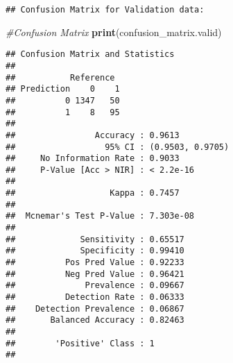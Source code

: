 \documentclass[
]{article}
\newenvironment{Shaded}{\begin{snugshade}}{\end{snugshade}}
\newcommand{\AttributeTok}[1]{\textcolor[rgb]{0.13,0.29,0.53}{#1}}
\newcommand{\CommentTok}[1]{\textcolor[rgb]{0.56,0.35,0.01}{\textit{#1}}}
\newcommand{\FunctionTok}[1]{\textcolor[rgb]{0.13,0.29,0.53}{\textbf{#1}}}
\newcommand{\NormalTok}[1]{#1}
\newcommand{\OtherTok}[1]{\textcolor[rgb]{0.56,0.35,0.01}{#1}}
\newcommand{\SpecialCharTok}[1]{\textcolor[rgb]{0.81,0.36,0.00}{\textbf{#1}}}
\newcommand{\StringTok}[1]{\textcolor[rgb]{0.31,0.60,0.02}{#1}}
\begin{document}
\begin{Shaded}
\end{Shaded}

\begin{verbatim}
## Confusion Matrix for Validation data:
\end{verbatim}

\begin{Shaded}
\begin{Highlighting}[]
\CommentTok{\#Confusion Matrix }
\FunctionTok{print}\NormalTok{(confusion\_matrix.valid)}
\end{Highlighting}
\end{Shaded}

\begin{verbatim}
## Confusion Matrix and Statistics
## 
##           Reference
## Prediction    0    1
##          0 1347   50
##          1    8   95
##                                           
##                Accuracy : 0.9613          
##                  95% CI : (0.9503, 0.9705)
##     No Information Rate : 0.9033          
##     P-Value [Acc > NIR] : < 2.2e-16       
##                                           
##                   Kappa : 0.7457          
##                                           
##  Mcnemar's Test P-Value : 7.303e-08       
##                                           
##             Sensitivity : 0.65517         
##             Specificity : 0.99410         
##          Pos Pred Value : 0.92233         
##          Neg Pred Value : 0.96421         
##              Prevalence : 0.09667         
##          Detection Rate : 0.06333         
##    Detection Prevalence : 0.06867         
##       Balanced Accuracy : 0.82463         
##                                           
##        'Positive' Class : 1               
## 
\end{verbatim}
\end{document}
